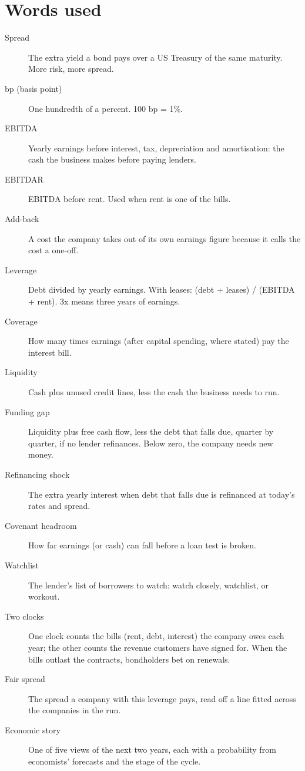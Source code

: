 \documentclass[11pt,a4paper]{article}
\begin{document}
\section*{Words used}
\begin{description}
\item[Spread] The extra yield a bond pays over a US Treasury of the same maturity. More risk, more spread.
\item[bp (basis point)] One hundredth of a percent. 100 bp = 1\%.
\item[EBITDA] Yearly earnings before interest, tax, depreciation and amortisation: the cash the business makes before paying lenders.
\item[EBITDAR] EBITDA before rent. Used when rent is one of the bills.
\item[Add-back] A cost the company takes out of its own earnings figure because it calls the cost a one-off.
\item[Leverage] Debt divided by yearly earnings. With leases: (debt + leases) / (EBITDA + rent). 3x means three years of earnings.
\item[Coverage] How many times earnings (after capital spending, where stated) pay the interest bill.
\item[Liquidity] Cash plus unused credit lines, less the cash the business needs to run.
\item[Funding gap] Liquidity plus free cash flow, less the debt that falls due, quarter by quarter, if no lender refinances. Below zero, the company needs new money.
\item[Refinancing shock] The extra yearly interest when debt that falls due is refinanced at today's rates and spread.
\item[Covenant headroom] How far earnings (or cash) can fall before a loan test is broken.
\item[Watchlist] The lender's list of borrowers to watch: watch closely, watchlist, or workout.
\item[Two clocks] One clock counts the bills (rent, debt, interest) the company owes each year; the other counts the revenue customers have signed for. When the bills outlast the contracts, bondholders bet on renewals.
\item[Fair spread] The spread a company with this leverage pays, read off a line fitted across the companies in the run.
\item[Economic story] One of five views of the next two years, each with a probability from economists' forecasts and the stage of the cycle.

\end{description}
\end{document}
